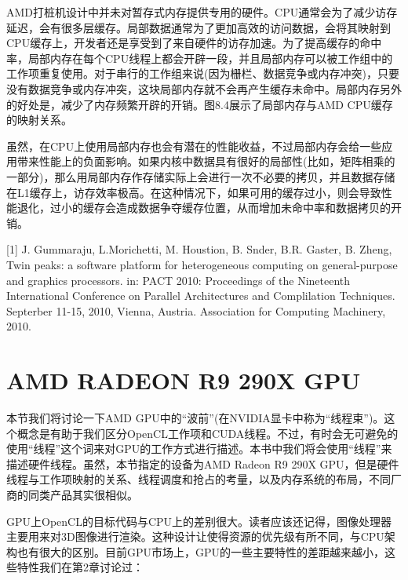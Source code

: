 AMD打桩机设计中并未对暂存式内存提供专用的硬件。CPU通常会为了减少访存延迟，会有很多层缓存。局部数据通常为了更加高效的访问数据，会将其映射到CPU缓存上，开发者还是享受到了来自硬件的访存加速。为了提高缓存的命中率，局部内存在每个CPU线程上都会开辟一段，并且局部内存可以被工作组中的工作项重复使用。对于串行的工作组来说(因为栅栏、数据竞争或内存冲突)，只要没有数据竞争或内存冲突，这块局部内存就不会再产生缓存未命中。局部内存另外的好处是，减少了内存频繁开辟的开销。图8.4展示了局部内存与AMD CPU缓存的映射关系。


虽然，在CPU上使用局部内存也会有潜在的性能收益，不过局部内存会给一些应用带来性能上的负面影响。如果内核中数据具有很好的局部性(比如，矩阵相乘的一部分)，那么用局部内存作存储实际上会进行一次不必要的拷贝，并且数据存储在L1缓存上，访存效率极高。在这种情况下，如果可用的缓存过小，则会导致性能退化，过小的缓存会造成数据争夺缓存位置，从而增加未命中率和数据拷贝的开销。

\myRefRule

\begin{myRefs}

[1] J. Gummaraju, L.Morichetti, M. Houstion, B. Snder, B.R. Gaster, B. Zheng, Twin peaks: a software platform for heterogeneous computing on general-purpose and graphics processors. in: PACT 2010: Proceedings of the Nineteenth International Conference on Parallel Architectures and Complilation Techniques. Septerber 11-15, 2010, Vienna, Austria. Association for Computing Machinery, 2010.

\end{myRefs}



\section{AMD RADEON R9 290X GPU}

本节我们将讨论一下AMD GPU中的“波前”(在NVIDIA显卡中称为“线程束”)。这个概念是有助于我们区分OpenCL工作项和CUDA线程。不过，有时会无可避免的使用“线程”这个词来对GPU的工作方式进行描述。本书中我们将会使用“线程”来描述硬件线程。虽然，本节指定的设备为AMD Radeon R9 290X GPU，但是硬件线程与工作项映射的关系、线程调度和抢占的考量，以及内存系统的布局，不同厂商的同类产品其实很相似。

GPU上OpenCL的目标代码与CPU上的差别很大。读者应该还记得，图像处理器主要用来对3D图像进行渲染。这种设计让使得资源的优先级有所不同，与CPU架构也有很大的区别。目前GPU市场上，GPU的一些主要特性的差距越来越小，这些特性我们在第2章讨论过：

